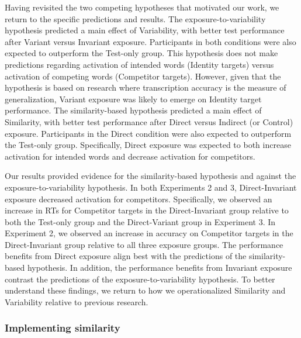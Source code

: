 \documentclass[preprint, 3p, authoryear]{elsarticle} %
\begin{document}
Having revisited the two competing hypotheses that motivated our work, we return to the specific predictions and results.
The exposure-to-variability hypothesis predicted a main effect of Variability, with better test performance after Variant versus Invariant exposure.
Participants in both conditions were also expected to outperform the Test-only group.
This hypothesis does not make predictions regarding activation of intended words (Identity targets) versus activation of competing words (Competitor targets).
However, given that the hypothesis is based on research where transcription accuracy is the measure of generalization, Variant exposure was likely to emerge on Identity target performance.
The similarity-based hypothesis predicted a main effect of Similarity, with better test performance after Direct versus Indirect (or Control) exposure.
Participants in the Direct condition were also expected to outperform the Test-only group.
Specifically, Direct exposure was expected to both increase activation for intended words and decrease activation for competitors.

Our results provided evidence for the similarity-based hypothesis and against the exposure-to-variability hypothesis.
In both Experiments 2 and 3, Direct-Invariant exposure decreased activation for competitors.
Specifically, we observed an increase in RTs for Competitor targets in the Direct-Invariant group relative to both the Test-only group and the Direct-Variant group in Experiment 3.
In Experiment 2, we observed an increase in accuracy on Competitor targets in the Direct-Invariant group relative to all three exposure groups.
The performance benefits from Direct exposure align best with the predictions of the similarity-based hypothesis.
In addition, the performance benefits from Invariant exposure contrast the predictions of the exposure-to-variability hypothesis.
To better understand these findings, we return to how we operationalized Similarity and Variability relative to previous research.

\hypertarget{discuss-sim}{%
\subsubsection{Implementing similarity}\label{discuss-sim}}
\end{document}
